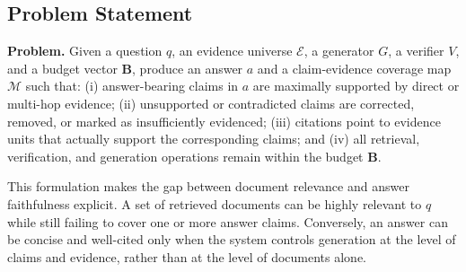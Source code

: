 \subsection{Problem Statement}
\label{subsec:problem_statement}

\textbf{Problem.} Given a question $q$, an evidence universe $\mathcal{E}$, a generator $G$, a verifier $V$, and a budget vector $\mathbf{B}$, produce an answer $a$ and a claim-evidence coverage map $\mathcal{M}$ such that: (i) answer-bearing claims in $a$ are maximally supported by direct or multi-hop evidence; (ii) unsupported or contradicted claims are corrected, removed, or marked as insufficiently evidenced; (iii) citations point to evidence units that actually support the corresponding claims; and (iv) all retrieval, verification, and generation operations remain within the budget $\mathbf{B}$.

This formulation makes the gap between document relevance and answer faithfulness explicit. A set of retrieved documents can be highly relevant to $q$ while still failing to cover one or more answer claims. Conversely, an answer can be concise and well-cited only when the system controls generation at the level of claims and evidence, rather than at the level of documents alone.
